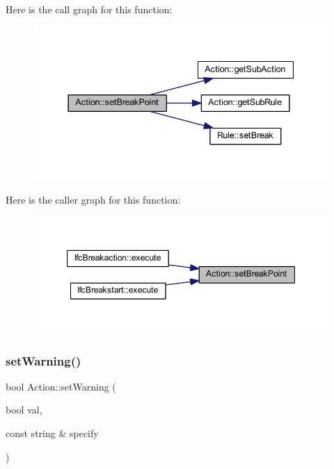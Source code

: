 Here is the call graph for this function\+:
\nopagebreak
\begin{figure}[H]
\begin{center}
\leavevmode
\includegraphics[width=337pt]{class_action_a52b3b4ed8ffd52be1b2d6b64c81f26a4_cgraph}
\end{center}
\end{figure}
Here is the caller graph for this function\+:
\nopagebreak
\begin{figure}[H]
\begin{center}
\leavevmode
\includegraphics[width=347pt]{class_action_a52b3b4ed8ffd52be1b2d6b64c81f26a4_icgraph}
\end{center}
\end{figure}
\mbox{\label{class_action_ad9b48eafb7c921a0365e78561aca3f13}} 
\subsubsection{\texorpdfstring{setWarning()}{setWarning()}}
{\footnotesize\ttfamily bool Action\+::set\+Warning (\begin{DoxyParamCaption}\item[{bool}]{val,  }\item[{const string \&}]{specify }\end{DoxyParamCaption})}



